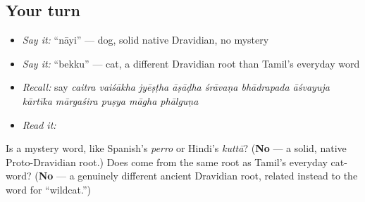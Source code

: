 \subsection*{Your turn}
\begin{itemize}
\raggedright
  \item \emph{Say it:} \textquotedblleft{}nāyi\textquotedblright{} — dog, solid native Dravidian, no mystery
  \item \emph{Say it:} \textquotedblleft{}bekku\textquotedblright{} — cat, a different Dravidian root than Tamil's everyday word
  \item \emph{Recall:} say \emph{caitra vaiśākha jyēṣṭha āṣāḍha śrāvaṇa bhādrapada āśvayuja kārtīka mārgaśira puṣya māgha phālguṇa}
  \item \emph{Read it:} \textbf{ }
\end{itemize}

\begin{tcolorbox}[breakable,colback=teal!4,colframe=teal!35!black,title={Before you move on}]
Is \textbf{} a mystery word, like Spanish's \emph{perro} or Hindi's \emph{kuttā}? (\textbf{No} — a solid, native Proto-Dravidian root.) Does \textbf{} come from the same root as Tamil's everyday cat-word? (\textbf{No} — a genuinely different ancient Dravidian root, related instead to the word for \textquotedblleft{}wildcat.\textquotedblright{})
\end{tcolorbox}

